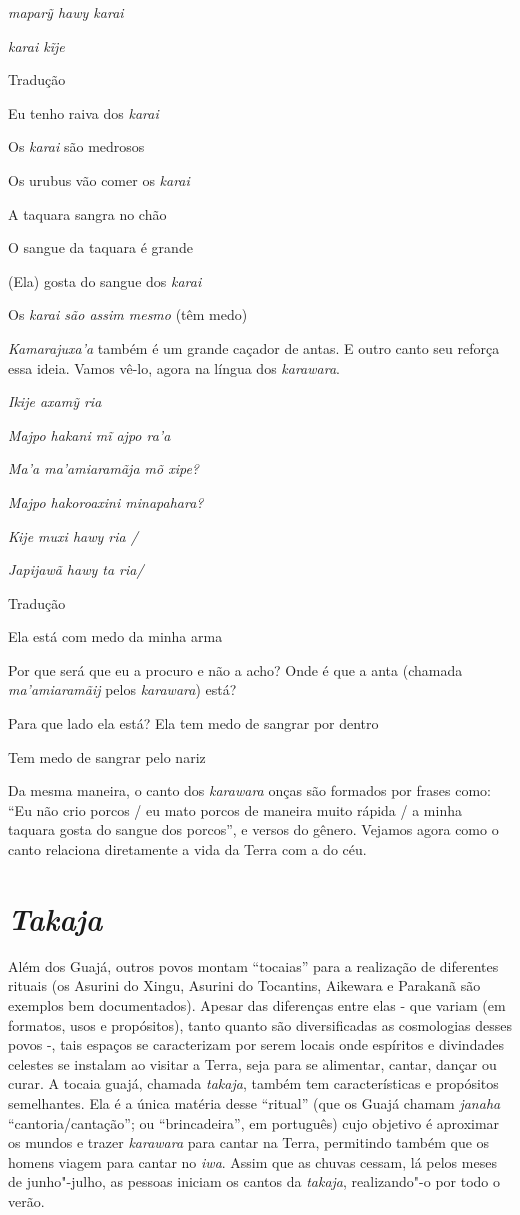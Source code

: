 \emph{maparỹ hawy karai}

\emph{karai kĩje}

Tradução

Eu tenho raiva dos \emph{karai}

Os \emph{karai} são medrosos

Os urubus vão comer os \emph{karai}

A taquara sangra no chão

O sangue da taquara é grande

(Ela) gosta do sangue dos \emph{karai}

Os \emph{karai são assim mesmo} (têm medo)

\emph{Kamarajuxa'a} também é um grande caçador de antas. E outro canto
seu reforça essa ideia. Vamos vê-lo, agora na língua dos
\emph{karawara}.

\emph{Ikije axamỹ ria }

\emph{Majpo hakani mĩ ajpo ra'a }

\emph{Ma'a ma'amiaramãja mõ xipe? }

\emph{Majpo hakoroaxini minapahara? }

\emph{Kije muxi hawy ria /}

\emph{Japijawã hawy ta ria/ }

Tradução

Ela está com medo da minha arma

Por que será que eu a procuro e não a acho? Onde é que a anta (chamada
\emph{ma'amiaramãij} pelos \emph{karawara}) está?

Para que lado ela está? Ela tem medo de sangrar por dentro

Tem medo de sangrar pelo nariz

Da mesma maneira, o canto dos \emph{karawara} onças são formados por
frases como: ``Eu não crio porcos / eu mato porcos de maneira muito
rápida / a minha taquara gosta do sangue dos porcos'', e versos do
gênero. Vejamos agora como o canto relaciona diretamente a vida da Terra
com a do céu.

\section{\emph{Takaja}}\label{takaja}

Além dos Guajá, outros povos montam ``tocaias'' para a realização de
diferentes rituais (os Asurini do Xingu, Asurini do Tocantins, Aikewara
e Parakanã são exemplos bem documentados). Apesar das diferenças entre
elas - que variam (em formatos, usos e propósitos), tanto quanto são
diversificadas as cosmologias desses povos -, tais espaços se
caracterizam por serem locais onde espíritos e divindades celestes se
instalam ao visitar a Terra, seja para se alimentar, cantar, dançar ou
curar. A tocaia guajá, chamada \emph{takaja}, também tem características
e propósitos semelhantes. Ela é a única matéria desse ``ritual'' (que os
Guajá chamam \emph{janaha} ``cantoria/cantação''; ou ``brincadeira'', em
português) cujo objetivo é aproximar os mundos e trazer \emph{karawara}
para cantar na Terra, permitindo também que os homens viagem para cantar
no \emph{iwa}. Assim que as chuvas cessam, lá pelos meses de
junho"-julho, as pessoas iniciam os cantos da \emph{takaja}, realizando"-o
por todo o verão.

